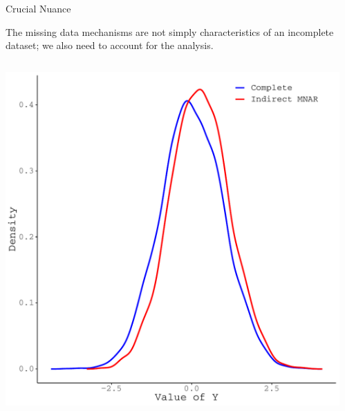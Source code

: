 \documentclass{beamer}\usepackage[]{graphicx}\usepackage[]{color}
\newenvironment{knitrout}{}{} %
\begin{document}
\begin{frame}{Crucial Nuance}

  The missing data mechanisms are not simply characteristics of an incomplete
  dataset; we also need to account for the analysis.
  \vb
  \begin{columns}
    \begin{column}{0.5\textwidth}

\begin{knitrout}\footnotesize
{}\color{fgcolor}

{\centering \includegraphics[width=1\linewidth]{figure/intro-unnamed-chunk-18-1} 

}


\end{knitrout}

\end{column}
\begin{column}{0.5\textwidth}

\begin{knitrout}\footnotesize
{}\color{fgcolor}


\end{knitrout}
\end{column}
\end{columns}
\end{frame}
\end{document}
